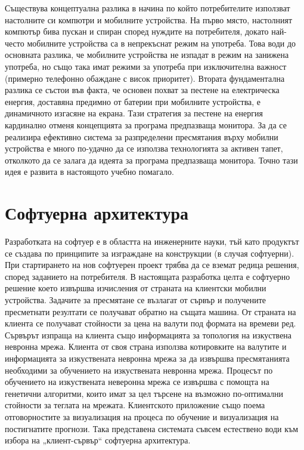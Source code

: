 \documentclass[book,14pt,oneside,openany]{memoir}
\begin{document}
Съществува концептуална разлика в начина по който потребителите използват настолните си компютри и мобилните устройства. На първо място, настолният компютър бива пускан и спиран според нуждите на потребителя, докато най-често мобилните устройства са в непрекъснат режим на употреба. Това води до основната разлика, че мобилните устройства не изпадат в режим на занижена употреба, но също така имат режими за употреба при изключителна важност (примерно телефонно обаждане с висок приоритет). Втората фундаментална разлика се състои във факта, че основен похват за пестене на електрическа енергия, доставяна предимно от батерии при мобилните устройства, е динамичното изгасяне на екрана. Тази стратегия за пестене на енергия кардинално отменя концепцията за програма предпазваща монитора. За да се реализира ефективно система за разпределени пресмятания върху мобилни устройства е много по-удачно да се използва технологията за активен тапет, отколкото да се залага да идеята за програма предпазваща монитора. Точно тази идея е развита в настоящото учебно помагало. 

\newpage
\chapter{Софтуерна архитектура}
\label{chapter03}

Разработката на софтуер е в областта на инженерните науки, тъй като продуктът се създава по принципите за изграждане на конструкции (в случая софтуерни). При стартирането на нов софтуерен проект трябва да се вземат редица решения, според заданието на потребителя. В настоящата разработка целта е софтуерно решение което извършва изчисления от страната на клиентски мобилни устройства. Задачите за пресмятане се възлагат от сървър и получените пресметнати резултати се получават обратно на същата машина. От страната на клиента се получават стойности за цена на валути под формата на времеви ред. Сървърът изпраща на клиента също информацията за топология на изкуствена невронна мрежа. Клиента от своя страна използва котировките на валутите и информацията за изкуствената невронна мрежа за да извършва пресмятанията необходими за обучението на изкуствената невронна мрежа. Процесът по обучението на изкуствената неверонна мрежа се извършва с помощта на генетични алгоритми, които имат за цел търсене на възможно по-оптимални стойности за теглата на мрежата. Клиентското приложение също поема отговорностите за визуализация на процеса по обучение и визуализация на постигнатите прогнози. Така представена системата съвсем естествено води към избора на „клиент-сървър“ софтуерна архитектура. 
\end{document}
